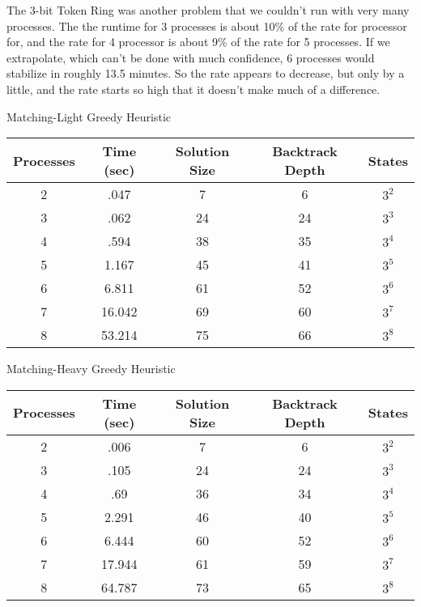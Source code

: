 The 3-bit Token Ring was another problem that we couldn't run with very many processes.  The the runtime
for 3 processes is about 10\% of the rate for processor for, and the rate for 4 processor is about 9\%
of the rate for 5 processes.  If we extrapolate, which can't be done with much confidence, 6 processes
would stabilize in roughly 13.5 minutes.  So the rate appears to decrease, but only by a little, and
the rate starts so high that it doesn't make much of a difference.

\begin{center}
Matching-Light Greedy Heuristic \\
\begin{tabular}{|c|c|c|c|c|}
\hline
 Processes & Time (sec) & Solution Size & Backtrack Depth & States \\
\hline         
 2 & .047 & 7 & 6 & $3^{2}$        \\
 3 & .062 & 24 & 24 & $3^{3}$       \\
 4 & .594 & 38 & 35 & $3^{4}$      \\
 5 & 1.167 & 45 & 41 & $3^{5}$      \\
 6 & 6.811 & 61 & 52 & $3^{6}$     \\
 7 & 16.042 & 69 & 60 & $3^{7}$    \\
 8 & 53.214 & 75 & 66 & $3^{8}$    \\
\hline
\end{tabular}
\end{center}

\begin{center}
Matching-Heavy Greedy Heuristic \\
\begin{tabular}{|c|c|c|c|c|}
\hline
 Processes & Time (sec) & Solution Size & Backtrack Depth & States \\
\hline         
 2 & .006 & 7 & 6 & $3^{2}$        \\
 3 & .105 & 24 & 24 & $3^{3}$       \\
 4 & .69 & 36 & 34 & $3^{4}$      \\
 5 & 2.291 & 46 & 40 & $3^{5}$      \\
 6 & 6.444 & 60 & 52 & $3^{6}$     \\
 7 & 17.944 & 61 & 59 & $3^{7}$    \\
 8 & 64.787 & 73 & 65 & $3^{8}$    \\
\hline
\end{tabular}
\end{center}

